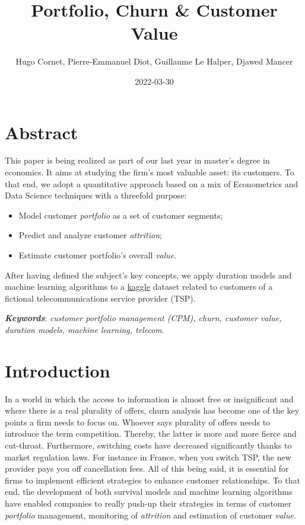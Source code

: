 \documentclass[
]{book}
\title{Portfolio, Churn \& Customer Value}
\author{Hugo Cornet, Pierre-Emmanuel Diot, Guillaume Le Halper, Djawed Mancer}
\date{2022-03-30}
\providecommand{\tightlist}{%
  \setlength{\itemsep}{0pt}\setlength{\parskip}{0pt}}
\begin{document}
\maketitle

{
\setcounter{tocdepth}{1}
\tableofcontents
}
\hypertarget{abstract}{%
\chapter*{Abstract}\label{abstract}}

This paper is being realized as part of our last year in master's degree in economics. It aims at studying the firm's most valuable asset: its customers. To that end, we adopt a quantitative approach based on a mix of Econometrics and Data Science techniques with a threefold purpose:

\begin{itemize}
\tightlist
\item
  Model customer \emph{portfolio} as a set of customer segments;
\item
  Predict and analyze customer \emph{attrition};
\item
  Estimate customer portfolio's overall \emph{value}.
\end{itemize}

After having defined the subject's key concepts, we apply duration models and machine learning algorithms to a \href{https://www.kaggle.com/yeanzc/telco-customer-churn-ibm-dataset}{kaggle} dataset related to customers of a fictional telecommunications service provider (TSP).

\textbf{\emph{Keywords}}: \emph{customer portfolio management (CPM), churn, customer value, duration models, machine learning, telecom.}

\hypertarget{intro}{%
\chapter{Introduction}\label{intro}}

In a world in which the access to information is almost free or insignificant and where there is a real plurality of offers, churn analysis has become one of the key points a firm needs to focus on. Whoever says plurality of offers needs to introduce the term competition. Thereby, the latter is more and more fierce and cut-throat. Furthermore, switching costs have decreased significantly thanks to market regulation laws. For instance in France, when you switch TSP, the new provider pays you off cancellation fees. All of this being said, it is essential for firms to implement efficient strategies to enhance customer relationships. To that end, the development of both survival models and machine learning algorithms have enabled companies to really push-up their strategies in terms of customer \emph{portfolio} management, monitoring of \emph{attrition} and estimation of customer \emph{value}.
\end{document}

